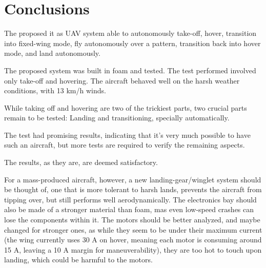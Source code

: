 \chapter{Conclusions} \label{chap:conclusions}

The proposed it as UAV system able to autonomously take-off, hover, transition into fixed-wing mode, fly autonomously over a pattern, transition back into hover mode, and land autonomously.

The proposed system was built in foam and tested.
The test performed involved only take-off and hovering. The aircraft behaved well on the harsh weather conditions, with 13 km/h winds.

While taking off and hovering are two of the trickiest parts, two crucial parts remain to be tested: Landing and transitioning, specially automatically.

The test had promising results, indicating that it's very much possible to have such an aircraft, but more tests are required to verify the remaining aspects.

The results, as they are, are deemed satisfactory.

For a mass-produced aircraft, however, a new landing-gear/winglet system should be thought of, one that is more tolerant to harsh lands, prevents the aircraft from tipping over, but still performs well aerodynamically.
The electronics bay should also be made of a stronger material than foam, mas even low-speed crashes can lose the components within it.
The motors should be better analyzed, and maybe changed for stronger ones, as while they seem to be under their maximum current (the wing currently uses 30 A on hover, meaning each motor is consuming around 15 A, leaving a 10 A margin for maneuverability), they are too hot to touch upon landing, which could be harmful to the motors.